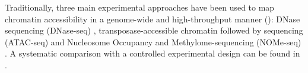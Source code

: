 
Traditionally, three main experimental approaches have been used to map chromatin accessibility in a genome-wide and high-throughput manner (): DNase sequencing (DNase-seq) \cite{Song2010}, transposase-accessible chromatin followed by sequencing (ATAC-seq) \cite{Buenrostro2013} and Nucleosome Occupancy and Methylome-sequencing (NOMe-seq) \cite{Kelly2012}. A systematic comparison with a controlled experimental design can be found in \cite{Nordstrom2019}.

